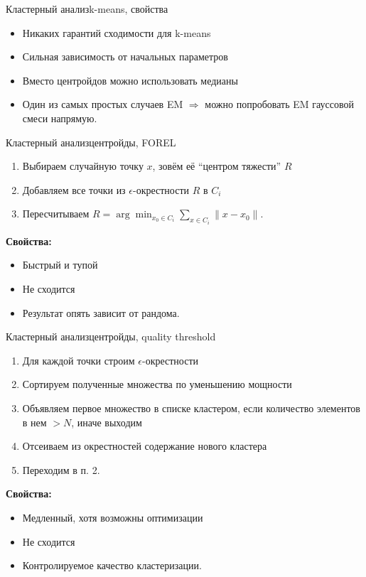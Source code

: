 \documentclass[14pt, fleqn, xcolor={dvipsnames, table}]{beamer}
\begin{document}
\begin{frame}{Кластерный анализ}{k-means, свойства}
\begin{itemize}
  \item Никаких гарантий сходимости для k-means
  \item Сильная зависимость от начальных параметров
  \item Вместо центройдов можно использовать медианы
  \item Один из самых простых случаев EM $\Rightarrow$ можно попробовать EM гауссовой смеси напрямую.
\end{itemize}
\end{frame}


\begin{frame}{Кластерный анализ}{центройды, FOREL}
\begin{enumerate}
  \item Выбираем случайную точку $x$, зовём её ``центром тяжести'' $R$
  \item Добавляем все точки из $\epsilon$-окрестности $R$ в $C_i$
  \item Пересчитываем $R = \arg \min_{x_0 \in C_i}\sum_{x\in C_i} \|x - x_0\|$.
\end{enumerate}
\textbf{Свойства:} 
\begin{itemize}
  \item Быстрый и тупой
  \item Не сходится
  \item Результат опять зависит от рандома.
\end{itemize}
\end{frame}

\begin{frame}{Кластерный анализ}{центройды, quality threshold}
\footnotesize
\begin{enumerate}
  \item Для каждой точки строим $\epsilon$-окрестности
  \item Сортируем полученные множества по уменьшению мощности
  \item Объявляем первое множество в списке кластером, если количество элементов в нем $> N$, иначе выходим
  \item Отсеиваем из окрестностей содержание нового кластера
  \item Переходим в п. 2.
\end{enumerate}
\textbf{Свойства:} 
\begin{itemize}
  \item Медленный, хотя возможны оптимизации
  \item Не сходится
  \item Контролируемое качество кластеризации.
\end{itemize}
\end{frame}
\end{document}
